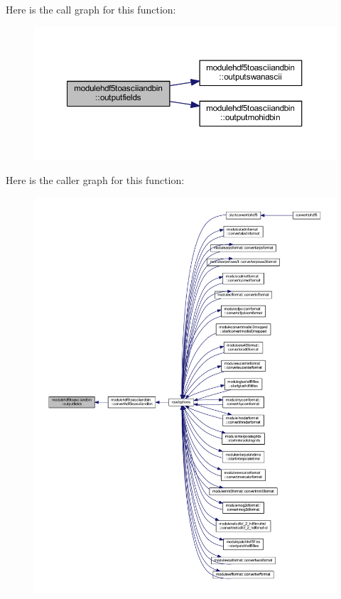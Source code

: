 Here is the call graph for this function\+:\nopagebreak
\begin{figure}[H]
\begin{center}
\leavevmode
\includegraphics[width=350pt]{namespacemodulehdf5toasciiandbin_a086893f6436263f0d9e808b779d5441d_cgraph}
\end{center}
\end{figure}
Here is the caller graph for this function\+:\nopagebreak
\begin{figure}[H]
\begin{center}
\leavevmode
\includegraphics[width=350pt]{namespacemodulehdf5toasciiandbin_a086893f6436263f0d9e808b779d5441d_icgraph}
\end{center}
\end{figure}
\mbox{\label{namespacemodulehdf5toasciiandbin_aff18abddac541bb4eb02be3abb3aa389}} 
